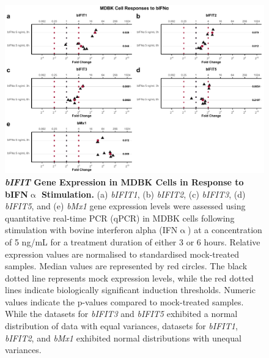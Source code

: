\begin{figure}
    \centering
    \includegraphics[width=1\linewidth]{07. Chapter 2/Figs/02. Induction/01. mdbk_treat_bifna.pdf}
    \caption[\textit{bIFIT} Gene Expression in MDBK Cells in Response to bIFN$\upalpha$ Stimulation.]{\textbf{\textit{bIFIT} Gene Expression in MDBK Cells in Response to bIFN$\upalpha$ Stimulation.} (a) \textit{bIFIT1}, (b) \textit{bIFIT2}, (c) \textit{bIFIT3}, (d) \textit{bIFIT5}, and (e) \textit{bMx1} gene expression levels were assessed using quantitative real-time PCR (qPCR) in MDBK cells following stimulation with bovine interferon alpha (IFN$\upalpha$) at a concentration of 5 ng/mL for a treatment duration of either 3 or 6 hours. Relative expression values are normalised to standardised mock-treated samples. Median values are represented by red circles. The black dotted line represents mock expression levels, while the red dotted lines indicate biologically significant induction thresholds. Numeric values indicate the p-values compared to mock-treated samples. While the datasets for \textit{bIFIT3} and \textit{bIFIT5} exhibited a normal distribution of data with equal variances, datasets for \textit{bIFIT1}, \textit{bIFIT2}, and \textit{bMx1} exhibited normal distributions with unequal variances.}
    \label{fig:MDBK responses to bIFNa}
\end{figure}

